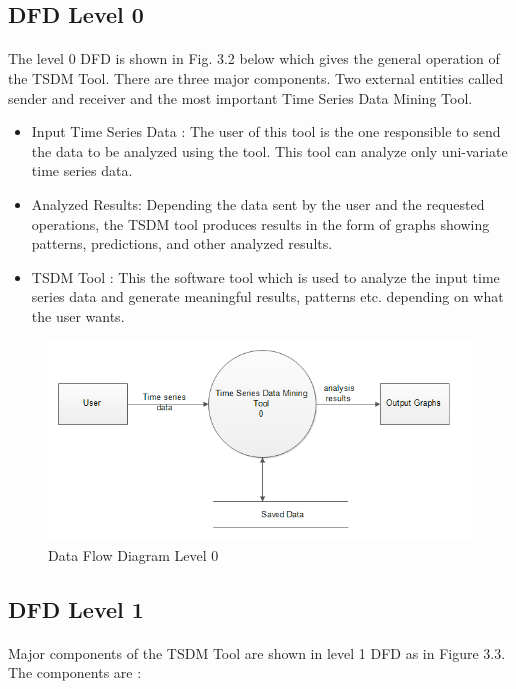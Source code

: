 \documentclass[12pt,a4paper]{report}
\begin{document}
\subsection{DFD Level 0}
\paragraph{}The level 0 DFD is shown in Fig. 3.2 below which gives the general operation of the TSDM Tool. There are three major components. Two external entities called sender and receiver and the most important Time Series Data Mining Tool.
\begin{itemize}
\item Input Time Series Data : The user of this tool  is the one responsible to send the data to be analyzed using the tool. This tool can analyze only uni-variate time series data.
\item Analyzed Results: Depending the data sent by the user and the requested operations, the TSDM tool produces results in the form of graphs showing patterns, predictions, and other analyzed results.
\item TSDM Tool : This the software tool which is used to analyze the input time series data and generate meaningful results, patterns etc. depending on what the user wants.
\end{itemize}
\begin{figure}[h!]
	\centering
		\includegraphics[scale=0.9]{screenshots/dfd_new_0.png}
		\caption{Data Flow Diagram Level 0}
\end{figure} 
\pagebreak
\subsection{DFD Level 1}
\paragraph{}Major components of the TSDM Tool are shown in  level 1 DFD as in Figure 3.3. The components are :
\end{document}
